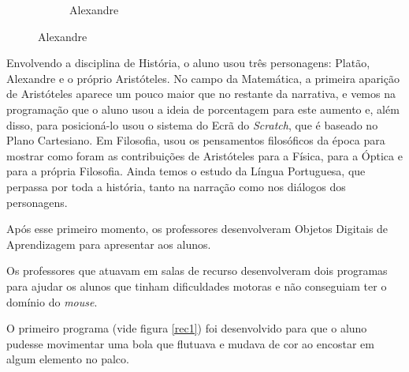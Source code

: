 \documentclass[12pt, openright, a4paper, brazil, english, french, spanish, bibjustif, openany, oneside]{abntex2}
\begin{document}
\begin{figure}[H]
\begin{subfigure}[b]{0.3\textwidth}
         \caption*{Alexandre}
         \label{alexandre}
     \end{subfigure}
     
    
\end{figure}

Envolvendo a disciplina de História, o aluno usou três personagens: Platão, Alexandre e o próprio Aristóteles. No campo da Matemática, a primeira aparição de Aristóteles aparece um pouco maior que no restante da narrativa, e vemos na programação que o aluno usou a ideia de porcentagem para este aumento e, além disso, para posicioná-lo usou o sistema do Ecrã do \textit{Scratch}, que é baseado no Plano Cartesiano. Em Filosofia, usou os pensamentos filosóficos da época para mostrar como foram as contribuições de Aristóteles para a Física, para a Óptica e para a própria Filosofia. Ainda temos o estudo da Língua Portuguesa, que perpassa por toda a história, tanto na narração como nos diálogos dos personagens. 

Após esse primeiro momento, os professores desenvolveram Objetos Digitais de Aprendizagem para apresentar aos alunos. 

Os professores que atuavam em salas de recurso desenvolveram dois programas para ajudar os alunos que tinham dificuldades motoras e não conseguiam ter o domínio do \textit{mouse}. 

\newpage

O primeiro programa (vide figura \ref{rec1}) foi desenvolvido para que o aluno pudesse movimentar uma bola que flutuava e mudava de cor ao encostar em algum elemento no palco.
\end{document}
